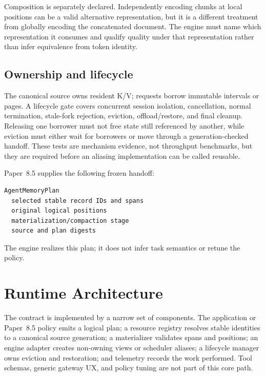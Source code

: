 \documentclass[11pt]{article}
\begin{document}
Composition is separately declared.  Independently encoding chunks at local
positions can be a valid alternative representation, but it is a different
treatment from globally encoding the concatenated document.  The engine must
name which representation it consumes and qualify quality under that
representation rather than infer equivalence from token identity.

\subsection{Ownership and lifecycle}

The canonical source owns resident K/V; requests borrow immutable intervals or
pages.  A lifecycle gate covers concurrent session isolation, cancellation,
normal termination, stale-fork rejection, eviction, offload/restore, and final
cleanup.  Releasing one borrower must not free state still referenced by
another, while eviction must either wait for borrowers or move through a
generation-checked handoff.  These tests are mechanism evidence, not throughput
benchmarks, but they are required before an aliasing implementation can be
called reusable.

Paper~8.5 supplies the following frozen handoff:
\begin{verbatim}
AgentMemoryPlan
  selected stable record IDs and spans
  original logical positions
  materialization/compaction stage
  source and plan digests
\end{verbatim}
The engine realizes this plan; it does not infer task semantics or retune the
policy.

\section{Runtime Architecture}

The contract is implemented by a narrow set of components.  The application or
Paper~8.5 policy emits a logical plan; a resource registry resolves stable
identities to a canonical source generation; a materializer validates spans and
positions; an engine adapter creates non-owning views or scheduler aliases; a
lifecycle manager owns eviction and restoration; and telemetry records the
work performed.  Tool schemas, generic gateway UX, and policy tuning are not
part of this core path.
\end{document}
